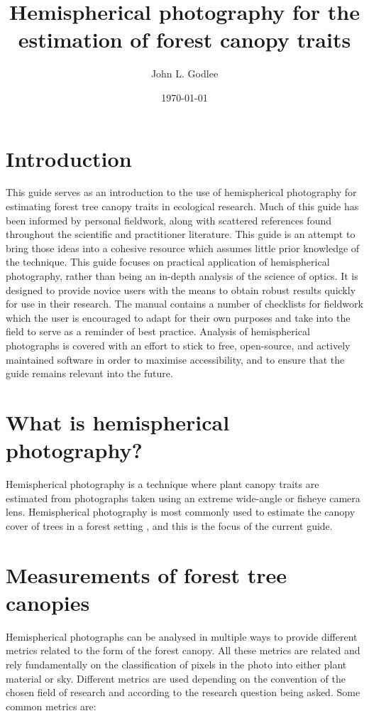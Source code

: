 \documentclass{article}
\title{Hemispherical photography for the estimation of forest canopy traits}
\date{\today}
\author{John L. Godlee}
\begin{document}
\maketitle

\tableofcontents
\newpage

\section{Introduction}

This guide serves as an introduction to the use of hemispherical photography for estimating forest tree canopy traits in ecological research. Much of this guide has been informed by personal fieldwork, along with scattered references found throughout the scientific and practitioner literature. This guide is an attempt to bring those ideas into a cohesive resource which assumes little prior knowledge of the technique. This guide focuses on practical application of hemispherical photography, rather than being an in-depth analysis of the science of optics. It is designed to provide novice users with the means to obtain robust results quickly for use in their research. The manual contains a number of checklists for fieldwork which the user is encouraged to adapt for their own purposes and take into the field to serve as a reminder of best practice. Analysis of hemispherical photographs is covered with an effort to stick to free, open-source, and actively maintained software in order to maximise accessibility, and to ensure that the guide remains relevant into the future.

\section{What is hemispherical photography?}

Hemispherical photography is a technique where plant canopy traits are estimated from photographs taken using an extreme wide-angle or fisheye camera lens. Hemispherical photography is most commonly used to estimate the canopy cover of trees in a forest setting \citep{Seidel2011, Macfarlane2014}, and this is the focus of the current guide. 
\section{Measurements of forest tree canopies}

Hemispherical photographs can be analysed in multiple ways to provide different metrics related to the form of the forest canopy. All these metrics are related and rely fundamentally on the classification of pixels in the photo into either plant material or sky. Different metrics are used depending on the convention of the chosen field of research and according to the research question being asked. Some common metrics are:
\end{document}
